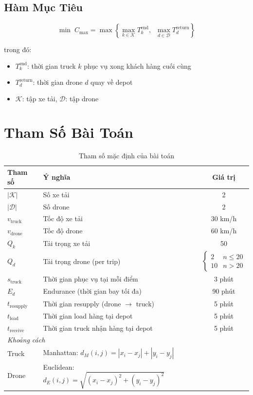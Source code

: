 \documentclass[12pt,a4paper]{article}
\begin{document}
\subsection{Hàm Mục Tiêu}

\begin{equation}
    \min \; C_{\max} = \max\left\{ 
        \max_{k \in \mathcal{K}} T_k^{\text{end}}, \;\;
        \max_{d \in \mathcal{D}} T_d^{\text{return}}
    \right\}
\end{equation}

trong đó:
\begin{itemize}[nosep]
    \item $T_k^{\text{end}}$: thời gian truck $k$ phục vụ xong khách hàng cuối cùng
    \item $T_d^{\text{return}}$: thời gian drone $d$ quay về depot
    \item $\mathcal{K}$: tập xe tải, $\mathcal{D}$: tập drone
\end{itemize}

\section{Tham Số Bài Toán}

\begin{table}[h!]
\centering
\caption{Tham số mặc định của bài toán}
\begin{tabular}{llc}
\toprule
\textbf{Tham số} & \textbf{Ý nghĩa} & \textbf{Giá trị} \\
\midrule
$|\mathcal{K}|$ & Số xe tải & 2 \\
$|\mathcal{D}|$ & Số drone & 2 \\
$v_{\text{truck}}$ & Tốc độ xe tải & 30 km/h \\
$v_{\text{drone}}$ & Tốc độ drone & 60 km/h \\
$Q_k$ & Tải trọng xe tải & 50 \\
$Q_d$ & Tải trọng drone (per trip) & $\begin{cases} 2 & n \leq 20 \\ 10 & n > 20 \end{cases}$ \\
$s_{\text{truck}}$ & Thời gian phục vụ tại mỗi điểm & 3 phút \\
$E_d$ & Endurance (thời gian bay tối đa) & 90 phút \\
$t_{\text{resupply}}$ & Thời gian resupply (drone $\to$ truck) & 5 phút \\
$t_{\text{load}}$ & Thời gian load hàng tại depot & 5 phút \\
$t_{\text{receive}}$ & Thời gian truck nhận hàng tại depot & 5 phút \\
\midrule
\multicolumn{3}{l}{\textit{Khoảng cách}} \\
Truck & Manhattan: $d_M(i,j) = |x_i - x_j| + |y_i - y_j|$ & \\
Drone & Euclidean: $d_E(i,j) = \sqrt{(x_i - x_j)^2 + (y_i - y_j)^2}$ & \\
\bottomrule
\end{tabular}
\end{table}
\end{document}
